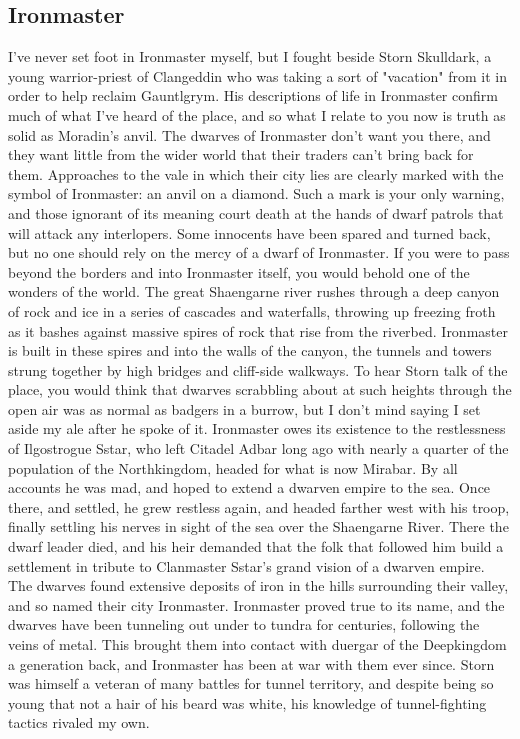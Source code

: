 \documentclass[10pt,a4paper,twoside,twocolumn,openany,bg=print,nodeprecatedcode]{dndbook}
\begin{document}
\subsection{Ironmaster}
I've never set foot in Ironmaster myself, but I fought beside Storn Skulldark, a young warrior-priest of Clangeddin who was taking a sort of "vacation" from it in order to help reclaim Gauntlgrym. His descriptions of life in Ironmaster confirm much of what I've heard of the place, and so what I relate to you now is truth as solid as Moradin's anvil.
The dwarves of Ironmaster don't want you there, and they want little from the wider world that their traders can't bring back for them. Approaches to the vale in which their city lies are clearly marked with the symbol of Ironmaster: an anvil on a diamond. Such a mark is your only warning, and those ignorant of its meaning court death at the hands of dwarf patrols that will attack any interlopers. Some innocents have been spared and turned back, but no one should rely on the mercy of a dwarf of Ironmaster.
If you were to pass beyond the borders and into Ironmaster itself, you would behold one of the wonders of the world. The great Shaengarne river rushes through a deep canyon of rock and ice in a series of cascades and waterfalls, throwing up freezing froth as it bashes against massive spires of rock that rise from the riverbed. Ironmaster is built in these spires and into the walls of the canyon, the tunnels and towers strung together by high bridges and cliff-side walkways. To hear Storn talk of the place, you would think that dwarves scrabbling about at such heights through the open air was as normal as badgers in a burrow, but I don't mind saying I set aside my ale after he spoke of it.
Ironmaster owes its existence to the restlessness of Ilgostrogue Sstar, who left Citadel Adbar long ago with nearly a quarter of the population of the Northkingdom, headed for what is now Mirabar. By all accounts he was mad, and hoped to extend a dwarven empire to the sea. Once there, and settled, he grew restless again, and headed farther west with his troop, finally settling his nerves in sight of the sea over the Shaengarne River. There the dwarf leader died, and his heir demanded that the folk that followed him build a settlement in tribute to Clanmaster Sstar's grand vision of a dwarven empire. The dwarves found extensive deposits of iron in the hills surrounding their valley, and so named their city Ironmaster.
Ironmaster proved true to its name, and the dwarves have been tunneling out under to tundra for centuries, following the veins of metal. This brought them into contact with duergar of the Deepkingdom a generation back, and Ironmaster has been at war with them ever since. Storn was himself a veteran of many battles for tunnel territory, and despite being so young that not a hair of his beard was white, his knowledge of tunnel-fighting tactics rivaled my own.
\end{document}
